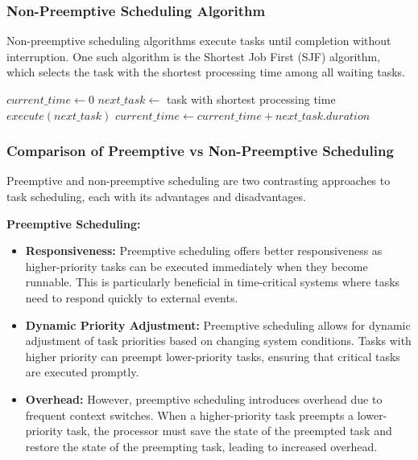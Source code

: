 \documentclass[12pt]{book} %
\begin{document}
\subsubsection{Non-Preemptive Scheduling Algorithm}

Non-preemptive scheduling algorithms execute tasks until completion without interruption. One such algorithm is the Shortest Job First (SJF) algorithm, which selects the task with the shortest processing time among all waiting tasks.
\FloatBarrier
\begin{algorithm}
\caption{Shortest Job First (SJF)}
\begin{algorithmic}[1]
\State $current\_time \gets 0$
\State $next\_task \gets$ task with shortest processing time
\State $execute(next\_task)$
\State $current\_time \gets current\_time + next\_task.duration$
\EndWhile
\EndProcedure
\end{algorithmic}
\end{algorithm}

\subsubsection{Comparison of Preemptive vs Non-Preemptive Scheduling}

Preemptive and non-preemptive scheduling are two contrasting approaches to task scheduling, each with its advantages and disadvantages.

\textbf{Preemptive Scheduling:}
\begin{itemize}
    \item \textbf{Responsiveness:} Preemptive scheduling offers better responsiveness as higher-priority tasks can be executed immediately when they become runnable. This is particularly beneficial in time-critical systems where tasks need to respond quickly to external events.
    \item \textbf{Dynamic Priority Adjustment:} Preemptive scheduling allows for dynamic adjustment of task priorities based on changing system conditions. Tasks with higher priority can preempt lower-priority tasks, ensuring that critical tasks are executed promptly.
    \item \textbf{Overhead:} However, preemptive scheduling introduces overhead due to frequent context switches. When a higher-priority task preempts a lower-priority task, the processor must save the state of the preempted task and restore the state of the preempting task, leading to increased overhead.
\end{itemize}
\end{document}
